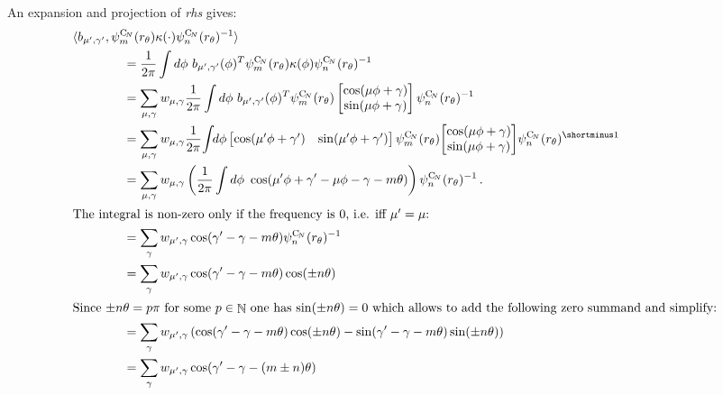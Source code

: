 \documentclass{article}
\newcommand{\lp}{\left(}
\newcommand{\rp}{\right)}
\DeclareMathOperator*{\N}{\mathbb{N}}
\newcommand{\CN}{\ensuremath{\operatorname{C}_{\!N}}}
\begin{document}
An expansion and projection of \textit{rhs} gives:
\begin{align*}
	&\langle b_{\mu',\gamma'},  \psi_m^{\CN}(r_\theta)\kappa(\cdot) \psi_n^{\CN}(r_\theta)^{-1}\rangle \\
	&\qquad\qquad= {1\over2\pi}\int d\phi \ b_{\mu',\gamma'}(\phi)^T \psi_m^{\CN}(r_\theta) \kappa(\phi) \psi_n^{\CN}(r_\theta)^{-1}\\
&\qquad\qquad= \sum_{\mu, \gamma} w_{\mu, \gamma} {1\over2\pi}\int d\phi \ b_{\mu',\gamma'}(\phi)^T 
	\psi_m^{\CN}(r_\theta) \begin{bmatrix} \cos(\mu\phi + \gamma) \\ \sin(\mu\phi + \gamma) \end{bmatrix} \psi_n^{\CN}(r_\theta)^{-1}\\
	&\qquad\qquad= \sum_{\mu, \gamma} w_{\mu, \gamma} {1\over2\pi}\!\int\!\! d\phi 
	\begin{bmatrix} \cos(\mu'\phi + \gamma') & \sin(\mu'\phi + \gamma') \end{bmatrix}
	\psi_m^{\CN}(r_\theta)\! \begin{bmatrix} \cos(\mu\phi + \gamma) \\ \sin(\mu\phi + \gamma) \end{bmatrix}\! \psi_n^{\CN}(r_\theta)^{\shortminus1}\\
	&\qquad\qquad= \sum_{\mu, \gamma} w_{\mu, \gamma} \lp {1\over2\pi}\int d\phi \ \cos(\mu'\phi + \gamma' -\mu\phi - \gamma -m\theta) \rp \psi_n^{\CN}(r_\theta)^{-1} \,. \\
\intertext{The integral is non-zero only if the frequency is $0$, i.e. iff $\mu'=\mu$: }
	&\qquad\qquad= \sum_{\gamma} w_{\mu', \gamma} \cos(\gamma'-\gamma -m\theta) \psi_n^{\CN}(r_\theta)^{-1} \\
	&\qquad\qquad= \sum_{\gamma} w_{\mu', \gamma} \cos(\gamma'-\gamma -m\theta) \cos(\pm n \theta) \\
\intertext{Since $\pm n\theta=p\pi$ for some $p\in\N$ one has $\sin(\pm n\theta)=0$ which allows to add the following zero summand and simplify:}
	&\qquad\qquad= \sum_{\gamma} w_{\mu', \gamma} \lp \cos(\gamma'-\gamma -m\theta) \cos(\pm n \theta) - \sin(\gamma'-\gamma -m\theta) \sin(\pm n \theta) \rp\\
	&\qquad\qquad= \sum_{\gamma} w_{\mu', \gamma} \cos(\gamma'-\gamma -(m \pm n) \theta)
\end{align*}
\end{document}
